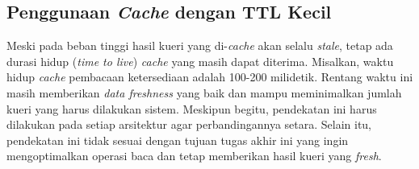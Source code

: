 \subsection{Penggunaan \textit{Cache} dengan TTL Kecil}

Meski pada beban tinggi hasil kueri yang di-\textit{cache} akan selalu \textit{stale}, tetap ada durasi hidup (\textit{time to live}) \textit{cache} yang masih dapat diterima. Misalkan, waktu hidup \textit{cache} pembacaan ketersediaan adalah 100-200 milidetik. Rentang waktu ini masih memberikan \textit{data freshness} yang baik dan mampu meminimalkan jumlah kueri yang harus dilakukan sistem. Meskipun begitu, pendekatan ini harus dilakukan pada setiap arsitektur agar perbandingannya setara. Selain itu, pendekatan ini tidak sesuai dengan tujuan tugas akhir ini yang ingin mengoptimalkan operasi baca dan tetap memberikan hasil kueri yang \textit{fresh}.